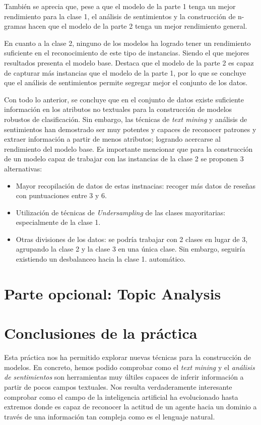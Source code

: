 \documentclass[es]{uc3mreport}
\begin{document}
\begin{report}
También se aprecia que, pese a que el modelo de la parte 1 tenga un mejor
rendimiento para la clase 1, el análisis de sentimientos y la construcción de
n-gramas hacen que el modelo de la parte 2 tenga un mejor rendimiento general.

En cuanto a la clase 2, ninguno de los modelos ha logrado tener un rendimiento
suficiente en el reconocimiento de este tipo de instancias. Siendo el que
mejores resultados presenta el modelo base. Destaca que el modelo de la parte 2
es capaz de capturar más instancias que el modelo de la parte 1, por lo que se
concluye que el análisis de sentimientos permite segregar mejor el conjunto de
los datos.

Con todo lo anterior, se concluye que en el conjunto de datos existe suficiente
información en los atributos no textuales para la construcción de modelos
robustos de clasificación. Sin embargo, las técnicas de \textit{text mining} y
análisis de sentimientos han demostrado ser muy potentes y capaces de reconocer
patrones y extraer información a partir de menos atributos; logrando acercarse
al rendimiento del modelo base. Es importante mencionar que para la construcción
de un modelo capaz de trabajar con las instancias de la clase 2 se proponen 3
alternativas:

\begin{itemize}
    \item Mayor recopilación de datos de estas instnacias: recoger más datos de
    reseñas con puntuaciones entre 3 y 6.
    \item Utilización de técnicas de \textit{Undersampling} de las clases
    mayoritarias: especialmente de la clase 1.
    \item Otras divisiones de los datos: se podría trabajar con 2 clases en
    lugar de 3, agrupando la clase 2 y la clase 3 en una única clase. Sin
    embargo, seguiría existiendo un desbalanceo hacia la clase 1.
    automático.
\end{itemize}

\section{Parte opcional: Topic Analysis}
\label{chap:topic}

\section{Conclusiones de la práctica}
\label{chap:conclusion}

Esta práctica nos ha permitido explorar nuevas técnicas para la construcción de modelos. En concreto, hemos podido comprobar como el \textit{text mining} y el \textit{análisis de sentimientos} son herramientas muy últiles capaces de inferir información a partir de pocos campos textuales. Nos resulta verdaderamente interesante comprobar como el campo de la inteligencia artificial ha evolucionado hasta extremos donde es capaz de reconocer la actitud de un agente hacia un dominio a través de una información tan compleja como es el lenguaje natural.


\end{report}
\end{document}
